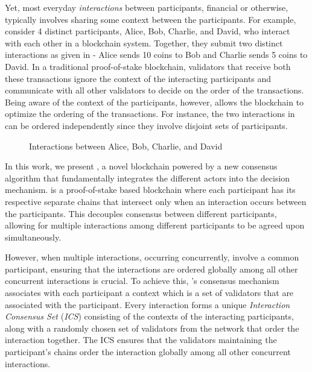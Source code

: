 Yet, most everyday \textit{interactions} between participants, financial or otherwise, typically involves sharing some context between the participants. For example, consider 4 distinct participants, Alice, Bob, Charlie, and David, who interact with each other in a blockchain system. Together, they submit two distinct interactions as given in  - Alice sends 10 coins to Bob and Charlie sends 5 coins to David. In a traditional proof-of-stake blockchain, validators that receive both these transactions ignore the context of the interacting participants and communicate with all other validators to decide on the order of the transactions. Being aware of the context of the participants, however, allows the blockchain to optimize the ordering of the transactions. For instance, the two interactions in  can be ordered independently since they involve disjoint sets of participants.

\begin{figure}[h!]
	\caption{Interactions between Alice, Bob, Charlie, and David}
	\label{fig:intro}
\end{figure}


In this work, we present \codename{}, a novel blockchain powered by a new consensus algorithm that fundamentally integrates the different actors into the decision mechanism. \codename{} is a proof-of-stake based blockchain where each participant has its respective separate chains that intersect only when an interaction occurs between the participants. This decouples consensus between different participants, allowing for multiple interactions among different participants to be agreed upon simultaneously.

However, when multiple interactions, occurring concurrently, involve a common participant, ensuring that the interactions are ordered globally among all other concurrent interactions is crucial. To achieve this, \codename{}'s consensus mechanism associates with each participant a context which is a set of validators that are associated with the participant. 
Every interaction forms a unique \emph{Interaction Consensus Set} (\emph{ICS}) consisting of the contexts of the interacting participants, along with a randomly chosen set of validators from the network that order the interaction together. The ICS ensures that the validators maintaining the participant's chains order the interaction globally among all other concurrent interactions.

